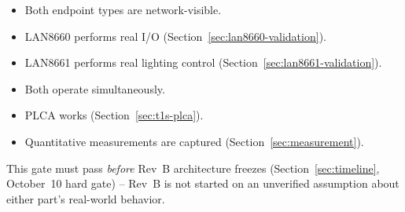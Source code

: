 \begin{itemize}[itemsep=0.1em, label={$\square$}]
\item Both endpoint types are network-visible.
\item LAN8660 performs real I/O (Section~\ref{sec:lan8660-validation}).
\item LAN8661 performs real lighting control (Section~\ref{sec:lan8661-validation}).
\item Both operate simultaneously.
\item PLCA works (Section~\ref{sec:t1s-plca}).
\item Quantitative measurements are captured (Section~\ref{sec:measurement}).
\end{itemize}

This gate must pass \emph{before} Rev~B architecture freezes (Section~\ref{sec:timeline}, October~10 hard gate) -- Rev~B is not started on an unverified assumption about either part's real-world behavior.
